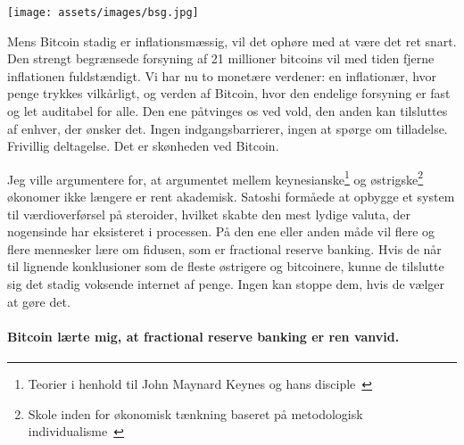 \begin{center}
  \centering
  \texttt{[image: assets/images/bsg.jpg]}
  \label{fig:bsg}
\end{center}

Mens Bitcoin stadig er inflationsmæssig, vil det ophøre med at være det ret snart.
Den strengt begrænsede forsyning af 21 millioner bitcoins vil med tiden fjerne
inflationen fuldstændigt. Vi har nu to monetære verdener: en
inflationær, hvor penge trykkes vilkårligt, og verden af
Bitcoin, hvor den endelige forsyning er fast og let auditabel for alle.
Den ene påtvinges os ved vold, den anden kan tilsluttes af enhver, der ønsker det.
Ingen indgangsbarrierer, ingen at spørge om tilladelse.
Frivillig deltagelse. Det er skønheden ved Bitcoin.

Jeg ville argumentere for, at argumentet mellem keynesianske\footnote{Teorier i
henhold til John Maynard Keynes og hans disciple~\cite{wiki:keynesian}} og
østrigske\footnote{Skole inden for økonomisk tænkning baseret på metodologisk
individualisme~\cite{wiki:austrian}} økonomer ikke længere er rent akademisk.
Satoshi formåede at opbygge et system til værdioverførsel på steroider, hvilket skabte
den mest lydige valuta, der nogensinde har eksisteret i processen. På den ene eller anden måde vil flere og
flere mennesker lære om fidusen, som er fractional reserve banking. Hvis
de når til lignende konklusioner som de fleste østrigere og bitcoinere, kunne de
tilslutte sig det stadig voksende internet af penge. Ingen kan stoppe dem, hvis de vælger at
gøre det.

\paragraph{Bitcoin lærte mig, at fractional reserve banking er ren vanvid.}

%
%
%
%
%
